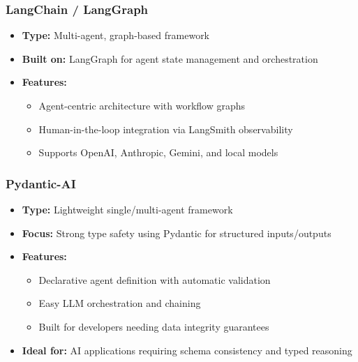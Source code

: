 \begin{frame}[fragile]\frametitle{LangChain / LangGraph}
    \begin{itemize}
        \item \textbf{Type:} Multi-agent, graph-based framework
        \item \textbf{Built on:} LangGraph for agent state management and orchestration
        \item \textbf{Features:}
              \begin{itemize}
                  \item Agent-centric architecture with workflow graphs
                  \item Human-in-the-loop integration via LangSmith observability
                  \item Supports OpenAI, Anthropic, Gemini, and local models
              \end{itemize}
    \end{itemize}
\end{frame}

\begin{frame}[fragile]\frametitle{Pydantic-AI}
    \begin{itemize}
        \item \textbf{Type:} Lightweight single/multi-agent framework
        \item \textbf{Focus:} Strong type safety using Pydantic for structured inputs/outputs
        \item \textbf{Features:}
              \begin{itemize}
                  \item Declarative agent definition with automatic validation
                  \item Easy LLM orchestration and chaining
                  \item Built for developers needing data integrity guarantees
              \end{itemize}
        \item \textbf{Ideal for:} AI applications requiring schema consistency and typed reasoning
    \end{itemize}
\end{frame}

